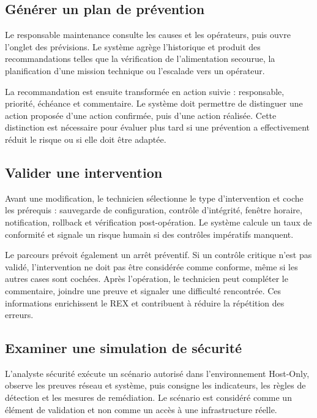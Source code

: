 \documentclass[12pt,a4paper,oneside]{report}
\begin{document}
\subsection{Générer un plan de prévention}

Le responsable maintenance consulte les causes et les opérateurs, puis ouvre l’onglet des prévisions. Le système agrège l’historique et produit des recommandations telles que la vérification de l’alimentation secourue, la planification d’une mission technique ou l’escalade vers un opérateur.

La recommandation est ensuite transformée en action suivie : responsable, priorité, échéance et commentaire. Le système doit permettre de distinguer une action proposée d’une action confirmée, puis d’une action réalisée. Cette distinction est nécessaire pour évaluer plus tard si une prévention a effectivement réduit le risque ou si elle doit être adaptée.

\subsection{Valider une intervention}

Avant une modification, le technicien sélectionne le type d’intervention et coche les prérequis : sauvegarde de configuration, contrôle d’intégrité, fenêtre horaire, notification, rollback et vérification post-opération. Le système calcule un taux de conformité et signale un risque humain si des contrôles impératifs manquent.

Le parcours prévoit également un arrêt préventif. Si un contrôle critique n’est pas validé, l’intervention ne doit pas être considérée comme conforme, même si les autres cases sont cochées. Après l’opération, le technicien peut compléter le commentaire, joindre une preuve et signaler une difficulté rencontrée. Ces informations enrichissent le REX et contribuent à réduire la répétition des erreurs.

\subsection{Examiner une simulation de sécurité}

L’analyste sécurité exécute un scénario autorisé dans l’environnement Host-Only, observe les preuves réseau et système, puis consigne les indicateurs, les règles de détection et les mesures de remédiation. Le scénario est considéré comme un élément de validation et non comme un accès à une infrastructure réelle.
\end{document}
